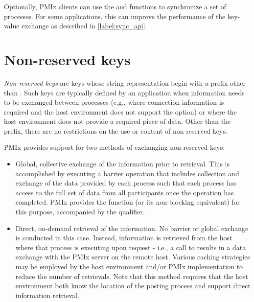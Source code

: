 Optionally, \ac{PMIx} clients can use the  and  functions to synchronize a set of processes.  For some applications, this can improve the performance of the key-value exchange as described in \ref{label:sync_api}.

\section{Non-reserved keys}

\emph{Non-reserved keys} are keys whose string representation begin with a
prefix other than . Such keys are typically defined by an
application when information needs to be exchanged between processes (e.g.,
where connection information is required and the host environment does not
support the  option) or where the host environment does not
provide a required piece of data. Other than the prefix, there are no
restrictions on the use or content of non-reserved keys.

\ac{PMIx} provides support for two methods of exchanging non-reserved keys:

\begin{itemize}
    \item Global, collective exchange of the information prior to retrieval. This is accomplished by executing a barrier operation that includes collection and exchange of the data provided by each process such that each process has access to the full set of data from all participants once the operation has completed. \ac{PMIx} provides the  function (or its non-blocking equivalent) for this purpose, accompanied by the  qualifier.
    \item Direct, on-demand retrieval of the information. No barrier or global exchange is conducted in this case. Instead, information is retrieved from the host where that process is executing upon request - i.e., a call to  results in a data exchange with the \ac{PMIx} server on the remote host. Various caching strategies may be employed by the host environment and/or \ac{PMIx} implementation to reduce the number of retrievals. Note that this method requires that the host environment both know the location of the posting process and support direct information retrieval.
\end{itemize}

